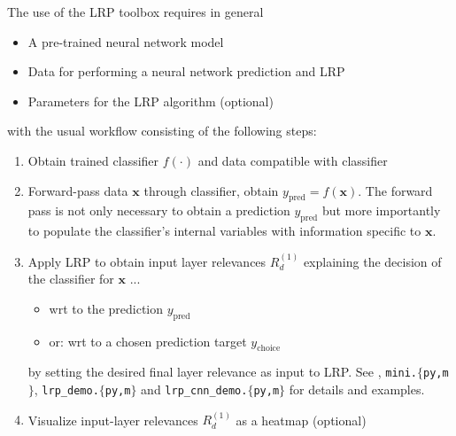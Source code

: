 \documentclass[a4wide]{article}
\newcommand{\x}{\boldsymbol{x}}
\begin{document}
The use of the LRP toolbox requires in general
\begin{itemize}
\item A pre-trained neural network model
\item Data for performing a neural network prediction and LRP
\item Parameters for the LRP algorithm (optional)
\end{itemize}
with the usual workflow consisting of the following steps:
\begin{enumerate}
\item Obtain trained classifier $f(\cdot)$ and data compatible with classifier
\item Forward-pass data $\x$ through classifier, obtain $y_{\text{pred}} = f(\x)$. The forward pass is not only necessary to obtain a prediction $y_{\text{pred}}$ but more importantly to populate the classifier's internal variables with information specific to $\x$.
\item Apply LRP to obtain input layer relevances $R^{(1)}_d$ explaining the decision of the classifier for $\x$ ...
	\begin{itemize}
		\item wrt to the prediction $y_{\text{pred}}$
		\item or: wrt to a chosen prediction target $y_{\text{choice}}$
	\end{itemize}
	by setting the desired final layer relevance as input to LRP. See \cite{bach15}, \texttt{mini.$\lbrace$py,m$\rbrace$}, \texttt{lrp\_demo.$\lbrace$py,m$\rbrace$} and \texttt{lrp\_cnn\_demo.$\lbrace$py,m$\rbrace$} for details and examples.
\item Visualize input-layer relevances $R_d^{(1)}$ as a heatmap (optional)
\end{enumerate}
\end{document}
